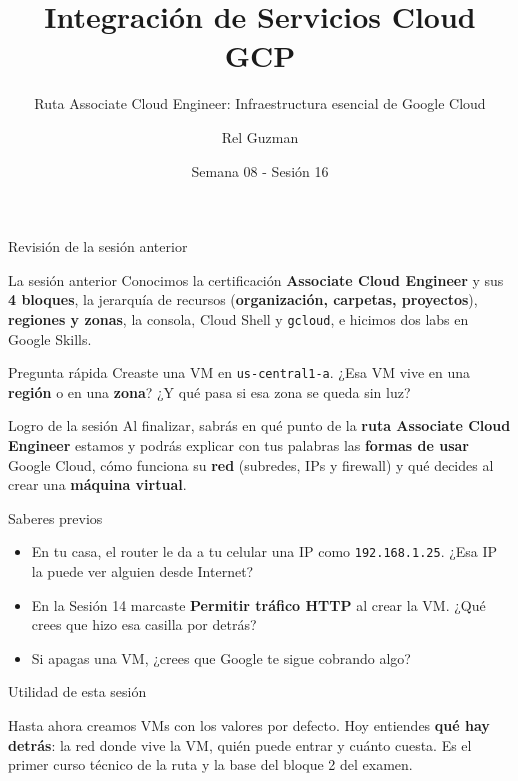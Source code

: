 \documentclass[aspectratio=169,10pt,c]{beamer}
\title{Integración de Servicios Cloud GCP}
\subtitle{Ruta Associate Cloud Engineer: Infraestructura esencial de Google Cloud}
\date{Semana 08 - Sesión 16}
\author{Rel Guzman}
\begin{document}
{\maketitle}

\begin{frame}[c]{Revisión de la sesión anterior}
\begin{block}{La sesión anterior}
\small Conocimos la certificación \textbf{Associate Cloud Engineer} y sus \textbf{4 bloques}, la jerarquía de recursos (\textbf{organización, carpetas, proyectos}), \textbf{regiones y zonas}, la consola, Cloud Shell y \texttt{gcloud}, e hicimos dos labs en Google Skills.
\end{block}
\begin{alertblock}{Pregunta rápida}
\small Creaste una VM en \texttt{us-central1-a}. ¿Esa VM vive en una \textbf{región} o en una \textbf{zona}? ¿Y qué pasa si esa zona se queda sin luz?
\end{alertblock}
\end{frame}

\begin{frame}[c]
\begin{block}{Logro de la sesión}
Al finalizar, sabrás en qué punto de la \textbf{ruta Associate Cloud Engineer} estamos y podrás explicar con tus palabras las \textbf{formas de usar} Google Cloud, cómo funciona su \textbf{red} (subredes, IPs y firewall) y qué decides al crear una \textbf{máquina virtual}.
\end{block}
\end{frame}

\begin{frame}{Saberes previos}
\begin{itemize}\setlength\itemsep{10pt}
  \item En tu casa, el router le da a tu celular una IP como \texttt{192.168.1.25}. ¿Esa IP la puede ver alguien desde Internet?
  \item En la Sesión 14 marcaste \textbf{Permitir tráfico HTTP} al crear la VM. ¿Qué crees que hizo esa casilla por detrás?
  \item Si apagas una VM, ¿crees que Google te sigue cobrando algo?
\end{itemize}
\end{frame}

\begin{frame}[c]{Utilidad de esta sesión}
\begin{center}
\begin{minipage}{.86\textwidth}
{\large Hasta ahora creamos VMs con los valores por defecto. Hoy entiendes \textbf{qué hay detrás}: la red donde vive la VM, quién puede entrar y cuánto cuesta. Es el primer curso técnico de la ruta y la base del bloque 2 del examen.}
\end{minipage}
\end{center}
\end{frame}
\end{document}
